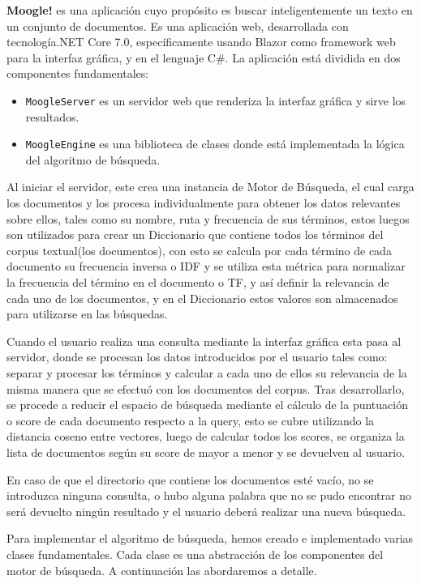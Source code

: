 \documentclass[12pt,a4paper]{report}
\begin{document}
\textbf{Moogle!} es una aplicación cuyo propósito es buscar inteligentemente un texto en un conjunto de documentos.
Es una aplicación web, desarrollada con tecnología.NET Core 7.0, específicamente usando Blazor como framework web para la interfaz gráfica, y en el lenguaje C\#. La aplicación está dividida en dos componentes fundamentales:
\begin{itemize}
	\item \texttt{MoogleServer} es un servidor web que renderiza la interfaz gráfica y sirve los resultados.
	\item \texttt{MoogleEngine} es una biblioteca de clases donde está implementada la lógica del algoritmo de búsqueda.
\end{itemize}
Al iniciar el servidor, este crea una instancia de Motor de Búsqueda, el cual carga los documentos y los procesa individualmente para obtener los datos relevantes sobre ellos, tales como su nombre, ruta y frecuencia de sus términos, estos luegos son utilizados para crear un Diccionario que contiene todos los términos del corpus textual(los documentos), con esto se calcula por cada término de cada documento su frecuencia inversa o IDF y se utiliza esta métrica para normalizar la frecuencia del término en el documento o TF, y así definir la relevancia de cada uno de los documentos, y en el Diccionario estos valores son almacenados para utilizarse en las búsquedas.\par
Cuando el usuario realiza una consulta mediante la interfaz gráfica esta pasa al servidor, donde se procesan los datos introducidos por el usuario tales como: separar y procesar los términos y calcular a cada uno de ellos su relevancia de la misma manera que se efectuó con los documentos del corpus. Tras desarrollarlo, se procede a reducir el espacio de búsqueda mediante el cálculo de la puntuación o score de cada documento respecto a la query, esto se cubre utilizando la distancia coseno entre vectores, luego de calcular todos los scores, se organiza la lista de documentos según su score de mayor a menor y se devuelven al usuario.\par
En caso de que el directorio que contiene los documentos esté vacío, no se introduzca ninguna consulta, o hubo alguna palabra que no se pudo encontrar no será devuelto ningún resultado y el usuario deberá realizar una nueva búsqueda.\par
Para implementar el algoritmo de búsqueda, hemos creado e implementado varias clases fundamentales. Cada clase es una abstracción de los componentes del motor de búsqueda. A continuación las abordaremos a detalle.
\end{document}
